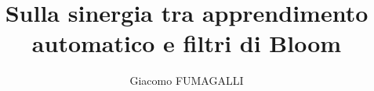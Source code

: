 \documentclass[a4paper,11pt]{report}
\begin{document}
\title{Sulla sinergia tra apprendimento automatico e filtri di Bloom}
\author{Giacomo FUMAGALLI}
\beforepreface
\end{document}

